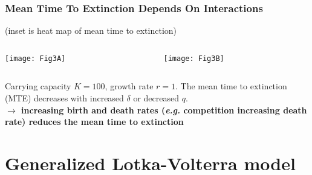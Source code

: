 \documentclass[dvipsnames]{beamer}
\begin{document}
\begin{frame}
\frametitle{Mean Time To Extinction Depends On Interactions}
\begin{center}
	(inset is heat map of mean time to extinction)
\end{center}
\vspace*{-0.7cm}
\begin{columns}
	\begin{column}{5.4cm}
		\begin{center}
			\texttt{[image: Fig3A]}%
		\end{center}
	\end{column}
	\begin{column}{5.4cm}
		\begin{center}
			\texttt{[image: Fig3B]}%
		\end{center}
	\end{column}
\end{columns}
\vspace{0.2cm}
\justifying
Carrying capacity $K=100$, growth rate $r=1$. 
The mean time to extinction (MTE) decreases with increased $\delta$ or decreased $q$. \\
\pause
\vspace{0.2cm}
\textbf{$\rightarrow$ increasing birth and death rates (\emph{e.g.} competition increasing death rate) reduces the mean time to extinction} 
\end{frame}


\section[Fixation]{Generalized Lotka-Volterra model}
\end{document}
